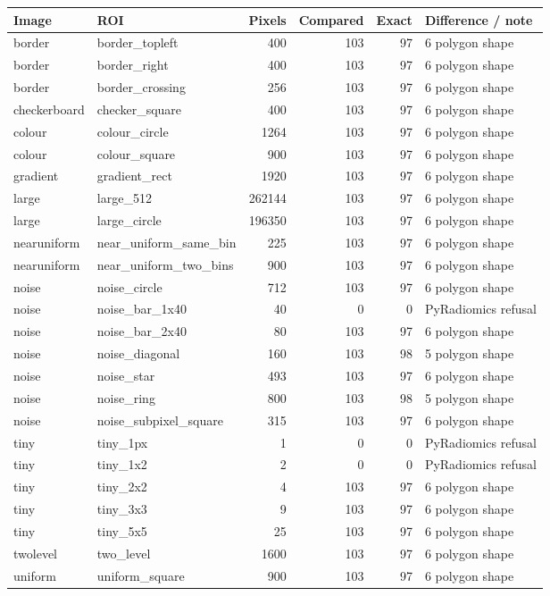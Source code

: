 \begin{tabular}{llrrrp{4.0cm}}
\toprule
Image & ROI & Pixels & Compared & Exact & Difference / note \\
\midrule
border & border\_topleft & 400 & 103 & 97 & 6 polygon shape \\
border & border\_right & 400 & 103 & 97 & 6 polygon shape \\
border & border\_crossing & 256 & 103 & 97 & 6 polygon shape \\
checkerboard & checker\_square & 400 & 103 & 97 & 6 polygon shape \\
colour & colour\_circle & 1264 & 103 & 97 & 6 polygon shape \\
colour & colour\_square & 900 & 103 & 97 & 6 polygon shape \\
gradient & gradient\_rect & 1920 & 103 & 97 & 6 polygon shape \\
large & large\_512 & 262144 & 103 & 97 & 6 polygon shape \\
large & large\_circle & 196350 & 103 & 97 & 6 polygon shape \\
nearuniform & near\_uniform\_same\_bin & 225 & 103 & 97 & 6 polygon shape \\
nearuniform & near\_uniform\_two\_bins & 900 & 103 & 97 & 6 polygon shape \\
noise & noise\_circle & 712 & 103 & 97 & 6 polygon shape \\
noise & noise\_bar\_1x40 & 40 & 0 & 0 & PyRadiomics refusal \\
noise & noise\_bar\_2x40 & 80 & 103 & 97 & 6 polygon shape \\
noise & noise\_diagonal & 160 & 103 & 98 & 5 polygon shape \\
noise & noise\_star & 493 & 103 & 97 & 6 polygon shape \\
noise & noise\_ring & 800 & 103 & 98 & 5 polygon shape \\
noise & noise\_subpixel\_square & 315 & 103 & 97 & 6 polygon shape \\
tiny & tiny\_1px & 1 & 0 & 0 & PyRadiomics refusal \\
tiny & tiny\_1x2 & 2 & 0 & 0 & PyRadiomics refusal \\
tiny & tiny\_2x2 & 4 & 103 & 97 & 6 polygon shape \\
tiny & tiny\_3x3 & 9 & 103 & 97 & 6 polygon shape \\
tiny & tiny\_5x5 & 25 & 103 & 97 & 6 polygon shape \\
twolevel & two\_level & 1600 & 103 & 97 & 6 polygon shape \\
uniform & uniform\_square & 900 & 103 & 97 & 6 polygon shape \\
\bottomrule
\end{tabular}
